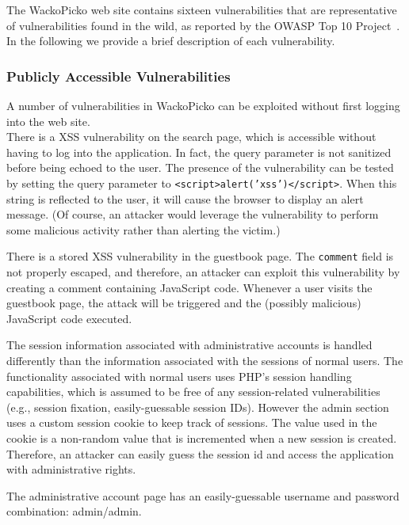 The WackoPicko web site contains sixteen vulnerabilities that are
representative of vulnerabilities found in the wild, as reported by the 
OWASP Top 10 Project~\cite{owasptopten}.
In the following we provide a brief description of each vulnerability.

\subsubsection{Publicly Accessible Vulnerabilities}
A number of vulnerabilities
in WackoPicko can be exploited without first logging into the web
site.\\

There is a XSS vulnerability on the search page, which is accessible without
having to log into the application. In fact, the query parameter is not
sanitized before being echoed to the user. The presence of the vulnerability
can be tested by setting the query parameter to
{\tt<script>alert('xss')</script>}. When this string is reflected to the user,
it will cause the browser to display an alert message. (Of course, an
attacker would leverage the vulnerability to perform some malicious
activity rather than alerting the victim.)

There is a stored XSS vulnerability in the
guestbook page. The {\tt comment} field is not properly escaped, and therefore, an
attacker can exploit this vulnerability by creating a comment containing
JavaScript code.
Whenever a user visits the
guestbook page, the attack will be triggered and the (possibly
malicious) JavaScript code executed.

The session information associated with administrative accounts is handled
differently than the information associated with the sessions of normal users.
The functionality associated with normal users uses PHP's session handling
capabilities, which is assumed to be free of any session-related
vulnerabilities (e.g., session fixation, easily-guessable session IDs).
However the admin section uses a custom session cookie to keep track of sessions.
The value used in the cookie is a non-random value that is incremented when a
new session is created. Therefore, an attacker can easily guess the session id
and access the application with administrative rights.

The administrative account page has an easily-guessable
username and password combination: admin/admin.

